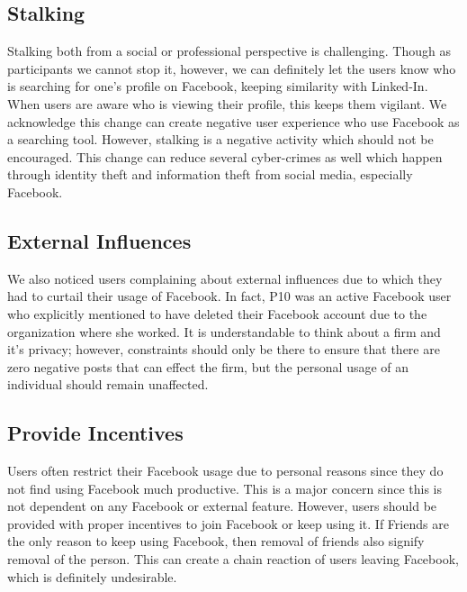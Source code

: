 \subsection{Stalking}
Stalking both from a social or professional perspective is challenging. Though as participants we cannot stop it, however, we can definitely let the users know who is searching for one's profile on Facebook, keeping similarity with Linked-In. When users are aware who is viewing their profile, this keeps them vigilant. We acknowledge this change can create negative user experience who use Facebook as a searching tool. However, stalking is a negative activity which should not be encouraged. This change can reduce several cyber-crimes as well which happen through identity theft and information theft from social media, especially Facebook.
\subsection{External Influences}
We also noticed users complaining about external influences due to which they had to curtail their usage of Facebook. In fact, P10 was an active Facebook user who explicitly mentioned to have deleted their Facebook account due to the organization where she worked. It is understandable to think about a firm and it's privacy; however, constraints should only be there to ensure that there are zero negative posts that can effect the firm, but the personal usage of an individual should remain unaffected.
\subsection{Provide Incentives}
Users often restrict their Facebook usage due to personal reasons since they do not find using Facebook much productive. This is a major concern since this is not dependent on any Facebook or external feature. However, users should be provided with proper incentives to join Facebook or keep using it. If Friends are the only reason to keep using Facebook, then removal of friends also signify removal of the person. This can create a chain reaction of users leaving Facebook, which is definitely undesirable.